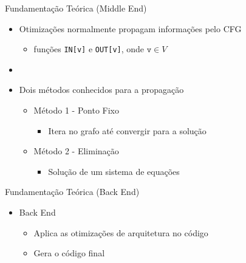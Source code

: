 \begin{frame}{Fundamentação Teórica (Middle End)}
  \begin{itemize}
      \item Otimizações normalmente propagam informações pelo CFG
          \begin{itemize}
              \item funções \texttt{IN[v]} e \texttt{OUT[v]}, onde $\texttt{v} \in V$
          \end{itemize}
      \item[]
      \item Dois métodos conhecidos para a propagação
      \begin{itemize}
          \item Método 1 - Ponto Fixo
              \begin{itemize}
                  \item Itera no grafo até convergir para a solução
              \end{itemize}
          \item Método 2 - Eliminação
              \begin{itemize}
                  \item Solução de um sistema de equações
              \end{itemize}
      \end{itemize}
  \end{itemize}
\end{frame}

\begin{frame}{Fundamentação Teórica (Back End)}
  \begin{itemize}
    \item Back End
    \begin{itemize}
        \item Aplica as otimizações {\color{blue}{dependentes}} de arquitetura no código
        \item Gera o código final
    \end{itemize}
  \end{itemize}
\end{frame}

